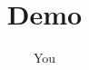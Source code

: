 \documentclass{imc-inf}
\title{Demo}
\author{You}
\begin{document}
\frontmatter\maketitle{}%
\begin{declarations}\end{declarations}%
\end{document}
